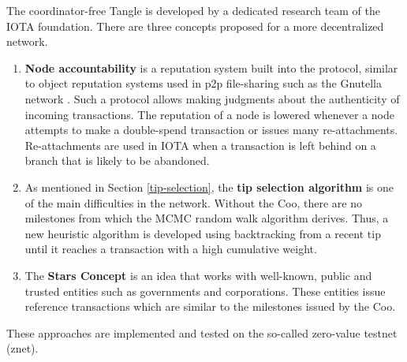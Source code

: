 The coordinator-free Tangle is developed by a dedicated research team of the IOTA foundation. There are three concepts proposed for a more decentralized network.
\begin{enumerate}
    \item \textbf{Node accountability} is a reputation system built into the protocol, similar to object reputation systems used in p2p file-sharing such as the Gnutella network \cite{object-reputation-system}. Such a protocol allows making judgments about the authenticity of incoming transactions. The reputation of a node is lowered whenever a node attempts to make a double-spend transaction or issues many re-attachments. Re-attachments are used in IOTA when a transaction is left behind on a branch that is likely to be abandoned.
    \item As mentioned in Section \ref{tip-selection}, the \textbf{tip selection algorithm} is one of the main difficulties in the network. Without the Coo, there are no milestones from which the MCMC random walk algorithm derives. Thus, a new heuristic algorithm is developed using backtracking from a recent tip until it reaches a transaction with a high cumulative weight.    
    \item The \textbf{Stars Concept} is an idea that works with well-known, public and trusted entities such as governments and corporations. These entities issue reference transactions which are similar to the milestones issued by the Coo.
\end{enumerate}

These approaches are implemented and tested on the so-called zero-value testnet (znet).
